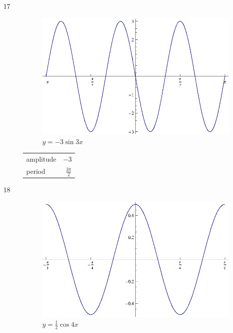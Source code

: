 \documentclass{exam}
\begin{document}
\begin{description}
      \item[17]
        \begin{figure}[H]
          \centering
          \includegraphics[scale=0.9]{exercise17.eps}
          \caption{$y = - 3 \sin 3x$}
        \end{figure}

        \begin{tabular}[H]{lr}
          \toprule
          amplitude & $-3$ \\
          period & $\frac{3 \pi}{2}$ \\
          \bottomrule
        \end{tabular}

      \item[18]
        \begin{figure}[H]
          \centering
          \includegraphics[scale=0.9]{exercise18.eps}
          \caption{$y = \frac{1}{2} \cos 4x$}
        \end{figure}


\end{description}
\end{document}
